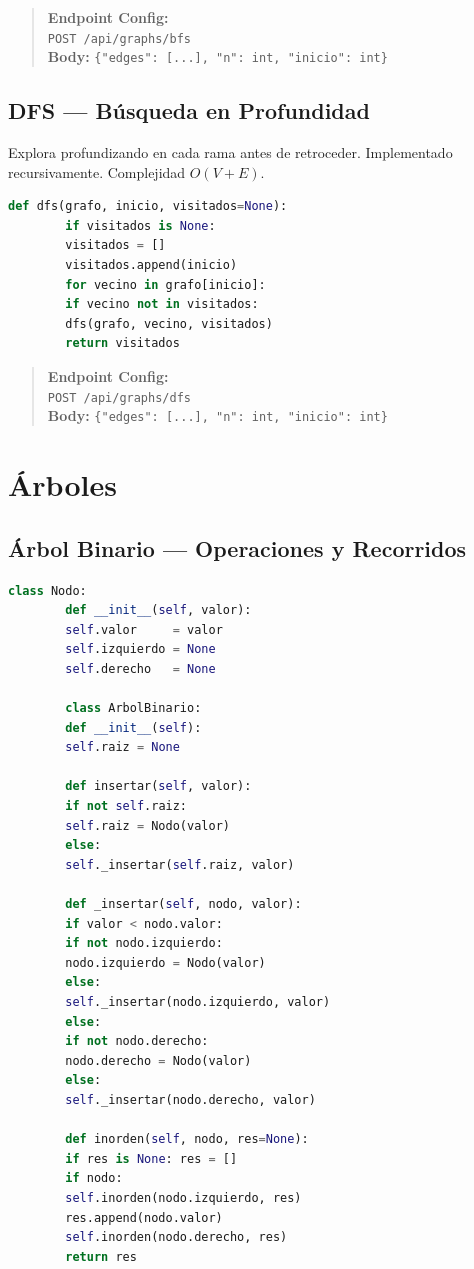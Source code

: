 \documentclass[12pt, letterpaper]{article}
\begin{document}
	\begin{quote}
		\textbf{Endpoint Config:} \\
		\texttt{POST /api/graphs/bfs} \\
		\textbf{Body:} \texttt{\{"edges": [...], "n": int, "inicio": int\}}
	\end{quote}
	
	\subsection{DFS — Búsqueda en Profundidad}
	Explora profundizando en cada rama antes de retroceder. Implementado recursivamente. Complejidad $O(V + E)$.
	
	\begin{lstlisting}[language=Python, caption={Implementacion DFS}]
		def dfs(grafo, inicio, visitados=None):
		if visitados is None:
		visitados = []
		visitados.append(inicio)
		for vecino in grafo[inicio]:
		if vecino not in visitados:
		dfs(grafo, vecino, visitados)
		return visitados
	\end{lstlisting}
	
	\begin{quote}
		\textbf{Endpoint Config:} \\
		\texttt{POST /api/graphs/dfs} \\
		\textbf{Body:} \texttt{\{"edges": [...], "n": int, "inicio": int\}}
	\end{quote}
	
	\section{Árboles}
	
	\subsection{Árbol Binario — Operaciones y Recorridos}
	\begin{lstlisting}[language=Python, caption={Arbol Binario de Busqueda}]
		class Nodo:
		def __init__(self, valor):
		self.valor     = valor
		self.izquierdo = None
		self.derecho   = None
		
		class ArbolBinario:
		def __init__(self):
		self.raiz = None
		
		def insertar(self, valor):
		if not self.raiz:
		self.raiz = Nodo(valor)
		else:
		self._insertar(self.raiz, valor)
		
		def _insertar(self, nodo, valor):
		if valor < nodo.valor:
		if not nodo.izquierdo:
		nodo.izquierdo = Nodo(valor)
		else:
		self._insertar(nodo.izquierdo, valor)
		else:
		if not nodo.derecho:
		nodo.derecho = Nodo(valor)
		else:
		self._insertar(nodo.derecho, valor)
		
		def inorden(self, nodo, res=None):
		if res is None: res = []
		if nodo:
		self.inorden(nodo.izquierdo, res)
		res.append(nodo.valor)
		self.inorden(nodo.derecho, res)
		return res
	\end{lstlisting}
	
\end{document}
